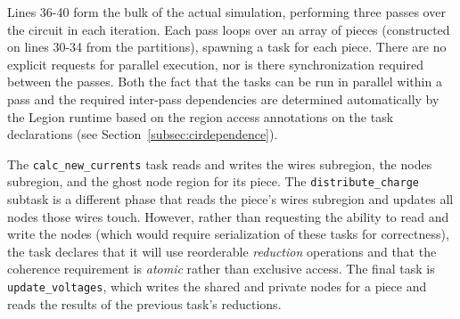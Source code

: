 


Lines 36-40 form the bulk of the actual simulation, performing three passes
over the circuit in each iteration.  Each pass loops over an array of pieces (constructed on lines 30-34 from the partitions),
spawning a task for each piece.   There are no explicit requests for
parallel execution, nor is there synchronization required between the
passes.  Both the fact that the tasks can be run in parallel within a pass
and the required inter-pass dependencies are determined automatically
by the Legion runtime based on the region access annotations on the task declarations
(see Section~\ref{subsec:cirdependence}).

The  {\tt calc\_new\_currents} task reads and writes the wires subregion, 
the nodes subregion, and the ghost node region for its piece.
The {\tt distribute\_charge} subtask is a different phase that reads the piece's 
wires subregion and updates all nodes those wires touch.  However,
rather than requesting the ability to read and write the nodes (which would
require serialization of these tasks for correctness), the task declares that
it will use reorderable {\em reduction} operations and that the coherence requirement
is {\em atomic} rather than exclusive access. The final task is 
{\tt update\_voltages}, which writes the shared and private nodes for a piece
and reads the results of the previous task's reductions.

